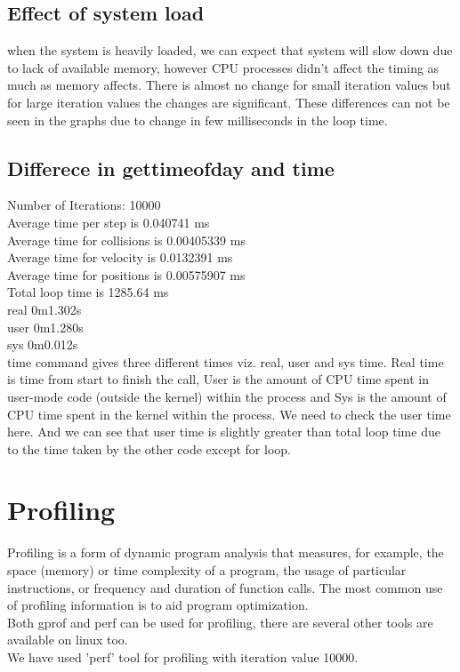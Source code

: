 \documentclass[11pt]{article}
\begin{document}
\subsection{Effect of system load}
when the system is heavily loaded, we can expect that system will slow down due to lack of available memory,  however CPU processes didn't affect the timing as much as memory affects. There is almost no change for small iteration values but for large iteration values the changes are significant.
These differences can not be seen in the graphs due to change in few milliseconds in the loop time.
\subsection{Differece in gettimeofday and time}
Number of Iterations: 10000 \\
Average time per step is 0.040741 ms \\
Average time for collisions is 0.00405339 ms \\
Average time for velocity is 0.0132391 ms \\
Average time for positions is 0.00575907 ms \\
Total loop time is 1285.64 ms \\
real	0m1.302s \\
user	0m1.280s \\
sys	0m0.012s \\

time command gives three different times viz. real, user and sys time. Real time is time from start to finish the call, User is the amount of CPU time spent in user-mode code (outside the kernel) within the process and Sys is the amount of CPU time spent in the kernel within the process. We need to check the user time here. And we can see that user time is slightly greater than total loop time due to the time taken by the other code except for loop. 

\section{Profiling}
Profiling is a form of dynamic program analysis that measures, for example, the space (memory) or time complexity of a program, the usage of particular instructions, or frequency and duration of function calls. The most common use of profiling information is to aid program optimization.\\
Both gprof and perf can be used for profiling, there are several other tools are available on linux too.\\
We have used 'perf' tool for profiling with iteration value 10000.
\end{document}
